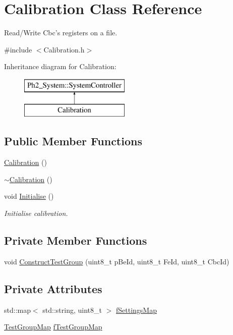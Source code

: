 \hypertarget{class_calibration}{\section{Calibration Class Reference}
\label{class_calibration}
}


Read/\-Write Cbc's registers on a file.  




{\ttfamily \#include $<$Calibration.\-h$>$}

Inheritance diagram for Calibration\-:\begin{figure}[H]
\begin{center}
\leavevmode
\includegraphics[height=2.000000cm]{class_calibration}
\end{center}
\end{figure}
\subsection*{Public Member Functions}
\begin{DoxyCompactItemize}
\item 
\hyperlink{class_calibration_a80f51a5ff7ec0f44d5388c9a61d1f20b}{Calibration} ()
\item 
\hyperlink{class_calibration_a108efb6ccd8c98e5cac950be4bf0ac26}{$\sim$\-Calibration} ()
\item 
void \hyperlink{class_calibration_aaa47b4d1bca9ab0b0255a323183d4f8d}{Initialise} ()
\begin{DoxyCompactList}\small\item\em Initialise calibration. \end{DoxyCompactList}\end{DoxyCompactItemize}
\subsection*{Private Member Functions}
\begin{DoxyCompactItemize}
\item 
void \hyperlink{class_calibration_a9b2de26014e8ecaa48b99d39bd1d5446}{Construct\-Test\-Group} (uint8\-\_\-t p\-Be\-Id, uint8\-\_\-t Fe\-Id, uint8\-\_\-t Cbc\-Id)
\end{DoxyCompactItemize}
\subsection*{Private Attributes}
\begin{DoxyCompactItemize}
\item 
std\-::map$<$ std\-::string, uint8\-\_\-t $>$ \hyperlink{class_calibration_a37b07f82cd185ea60bcbcf7cf602af49}{f\-Settings\-Map}
\item 
\hyperlink{_channel_8h_a4ea9798fb754a2f5910c0b01959c2256}{Test\-Group\-Map} \hyperlink{class_calibration_ac79d5ebc2766ebc9c5faf384a05581b0}{f\-Test\-Group\-Map}
\end{DoxyCompactItemize}
